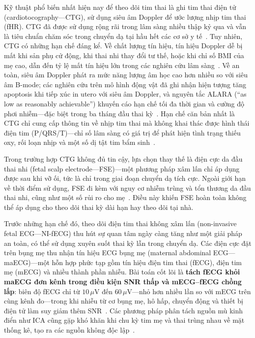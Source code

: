 \documentclass[../DoAn.tex]{subfiles}
\begin{document}
Kỹ thuật phổ biến nhất hiện nay để theo dõi tim thai là ghi tim thai điện tử (cardiotocography---CTG), sử dụng siêu âm Doppler để ước lượng nhịp tim thai (fHR). CTG đã được sử dụng rộng rãi trong lâm sàng nhiều thập kỷ qua và vẫn là tiêu chuẩn chăm sóc trong chuyển dạ tại hầu hết các cơ sở y tế~\cite{ayres-de-camposFIGOConsensusGuidelines2015}. Tuy nhiên, CTG có những hạn chế đáng kể. Về chất lượng tín hiệu, tín hiệu Doppler dễ bị mất khi sản phụ cử động, khi thai nhi thay đổi tư thế, hoặc khi chỉ số BMI của mẹ cao, dẫn đến tỷ lệ mất tín hiệu lớn trong các nghiên cứu lâm sàng~\cite{loversAdvancementsFetalHeart2025}. Về an toàn, siêu âm Doppler phát ra mức năng lượng âm học cao hơn nhiều so với siêu âm B-mode; các nghiên cứu trên mô hình động vật đã ghi nhận hiện tượng tăng apoptosis khi tiếp xúc in utero với siêu âm Doppler, và nguyên tắc ALARA (``as low as reasonably achievable'') khuyến cáo hạn chế tối đa thời gian và cường độ phơi nhiễm---đặc biệt trong ba tháng đầu thai kỳ~\cite{abramowiczFetalThermalEffects2008}. Hạn chế căn bản nhất là CTG chỉ cung cấp thông tin về nhịp tim thai mà không khai thác được hình thái điện tim (P/QRS/T)---chỉ số lâm sàng có giá trị để phát hiện tình trạng thiếu oxy, rối loạn nhịp và một số dị tật tim bẩm sinh~\cite{loversAdvancementsFetalHeart2025}.

Trong trường hợp CTG không đủ tin cậy, lựa chọn thay thế là điện cực da đầu thai nhi (fetal scalp electrode---FSE)---một phương pháp xâm lấn chỉ áp dụng được sau khi vỡ ối, tức là chỉ trong giai đoạn chuyển dạ tích cực. Ngoài giới hạn về thời điểm sử dụng, FSE đi kèm với nguy cơ nhiễm trùng và tổn thương da đầu thai nhi, cũng như một số rủi ro cho mẹ~\cite{neilsonFetalElectrocardiogramECG2015}. Điều này khiến FSE hoàn toàn không thể áp dụng cho theo dõi thai kỳ dài hạn hay theo dõi tại nhà.

Trước những hạn chế đó, theo dõi điện tim thai không xâm lấn (non-invasive fetal ECG---NI-fECG) thu hút sự quan tâm ngày càng tăng như một giải pháp an toàn, có thể sử dụng xuyên suốt thai kỳ lẫn trong chuyển dạ. Các điện cực đặt trên bụng mẹ thu nhận tín hiệu ECG bụng mẹ (maternal abdominal ECG---maECG)---một hỗn hợp phức tạp gồm tín hiệu điện tim thai (fECG), điện tim mẹ (mECG) và nhiều thành phần nhiễu. Bài toán cốt lõi là \textbf{tách fECG khỏi maECG đơn kênh trong điều kiện SNR thấp và mECG--fECG chồng lấp}: biên độ fECG chỉ từ $10\,\mu\text{V}$ đến $60\,\mu\text{V}$---nhỏ hơn nhiều lần so với mECG trên cùng kênh đo---trong khi nhiễu từ cơ bụng mẹ, hô hấp, chuyển động và thiết bị điện tử làm suy giảm thêm SNR~\cite{sameniReviewFetalECG2010}. Các phương pháp phân tách nguồn mù kinh điển như ICA cũng gặp khó khăn khi chu kỳ tim mẹ và thai trùng nhau về mặt thống kê, tạo ra các nguồn không độc lập~\cite{zarzosoRobustIndependentComponent2010}.
\end{document}
